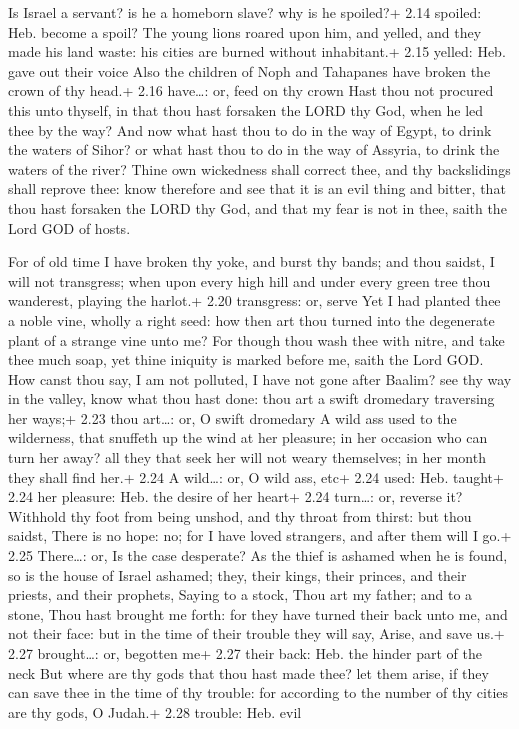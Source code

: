  Is Israel a servant? is he a homeborn slave? why is he
spoiled?+ 2.14 spoiled: Heb. become a spoil?  The young
lions roared upon him, and yelled, and they made his land waste: his
cities are burned without inhabitant.+ 2.15 yelled: Heb. gave out their
voice  Also the children of Noph and Tahapanes have broken
the crown of thy head.+ 2.16 have\ldots: or, feed on thy crown
 Hast thou not procured this unto thyself, in that thou
hast forsaken the LORD thy God, when he led thee by the way?
 And now what hast thou to do in the way of Egypt, to drink
the waters of Sihor? or what hast thou to do in the way of Assyria, to
drink the waters of the river?  Thine own wickedness shall
correct thee, and thy backslidings shall reprove thee: know therefore
and see that it is an evil thing and bitter, that thou hast forsaken the
LORD thy God, and that my fear is not in thee, saith the Lord GOD of
hosts.

 For of old time I have broken thy yoke, and burst thy
bands; and thou saidst, I will not transgress; when upon every high hill
and under every green tree thou wanderest, playing the harlot.+ 2.20
transgress: or, serve  Yet I had planted thee a noble vine,
wholly a right seed: how then art thou turned into the degenerate plant
of a strange vine unto me?  For though thou wash thee with
nitre, and take thee much soap, yet thine iniquity is marked before me,
saith the Lord GOD.  How canst thou say, I am not polluted,
I have not gone after Baalim? see thy way in the valley, know what thou
hast done: thou art a swift dromedary traversing her ways;+ 2.23 thou
art\ldots: or, O swift dromedary  A wild ass used to the
wilderness, that snuffeth up the wind at her pleasure; in her occasion
who can turn her away? all they that seek her will not weary themselves;
in her month they shall find her.+ 2.24 A wild\ldots: or, O wild ass,
etc+ 2.24 used: Heb. taught+ 2.24 her pleasure: Heb. the desire of her
heart+ 2.24 turn\ldots: or, reverse it?  Withhold thy foot
from being unshod, and thy throat from thirst: but thou saidst, There is
no hope: no; for I have loved strangers, and after them will I go.+ 2.25
There\ldots: or, Is the case desperate?  As the thief is
ashamed when he is found, so is the house of Israel ashamed; they, their
kings, their princes, and their priests, and their prophets,
 Saying to a stock, Thou art my father; and to a stone,
Thou hast brought me forth: for they have turned their back unto me, and
not their face: but in the time of their trouble they will say, Arise,
and save us.+ 2.27 brought\ldots: or, begotten me+ 2.27 their back: Heb.
the hinder part of the neck  But where are thy gods that
thou hast made thee? let them arise, if they can save thee in the time
of thy trouble: for according to the number of thy cities are thy gods,
O Judah.+ 2.28 trouble: Heb. evil

